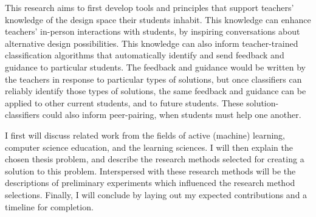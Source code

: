 \documentclass[12pt]{article}
\begin{document}
This research aims to first develop tools and principles that support teachers' knowledge of the design space their students inhabit. This knowledge can enhance teachers' in-person interactions with students, by inspiring conversations about alternative design possibilities. This knowledge can also inform teacher-trained classification algorithms that automatically identify and send feedback and guidance to particular students. The feedback and guidance would be written by the teachers in response to particular types of solutions, but once classifiers can reliably identify those types of solutions, the same feedback and guidance can be applied to other current students, and to future students. These solution-classifiers could also inform peer-pairing, when students must help one another.

I first will discuss related work from the fields of active (machine) learning, computer science education, and the learning sciences. I will then explain the chosen thesis problem, and describe the research methods selected for creating a solution to this problem. Interspersed with these research methods will be the descriptions of preliminary experiments which influenced the research method selections. Finally, I will conclude by laying out my expected contributions and a timeline for completion.

%
\end{document}

